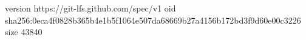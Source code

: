 version https://git-lfs.github.com/spec/v1
oid sha256:0eca4f0828b365b4e1b5f1064e507da68669b27a4156b172bd3f9d60e00c3226
size 43840
